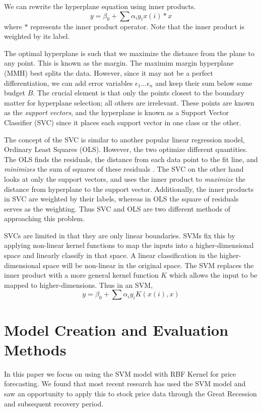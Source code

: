\documentclass[pageno]{jpaper}
\begin{document}
We can rewrite the hyperplane equation using inner products.
$$y = \beta_0 + \sum \alpha_iy_ix(i)*x$$
where $*$ represents the inner product operator. Note that the inner product is weighted by its label. 

The optimal hyperplane is such that we maximize the distance from the plane to any point. This is known as the margin. The maximim margin hyperplane (MMH) best splits the data. However, since it may not be a perfect differentiation, we can add error variables $\epsilon_1 ... \epsilon_n$ and keep their sum below some budget $B$. The crucial element is that only the points closest to the boundary matter for hyperplane selection; all others are irrelevant. These points are known as the {\em support vectors}, and the hyperplane is known as a Support Vector Classifier (SVC) since it places each support vector in one class or the other.

The concept of the SVC is similar to another popular linear regression model, Ordinary Least Squares (OLS). However, the two optimize different quantities. The OLS finds the residuals, the distance from each data point to the fit line, and {\em minimizes} the sum of squares of these residuals \cite{watson}. The SVC on the other hand looks at only the support vectors, and uses the inner product to {\em maximize} the distance from hyperplane to the support vector. Additionally, the inner products in SVC are weighted by their labels, whereas in OLS the square of residuals serves as the weighting. Thus SVC and OLS are two different methods of approaching this problem.

SVCs are limited in that they are only linear boundaries. SVMs fix this by applying non-linear kernel functions to map the inputs into a higher-dimensional space and linearly classify in that space. A linear classification in the higher-dimensional space will be non-linear in the original space. The SVM replaces the inner product with a more general kernel function $K$ which allows the input to be mapped to higher-dimensions. Thus in an SVM,
$$y = \beta_0 + \sum \alpha_i y_i K(x(i),x)$$

\section{Model Creation and Evaluation Methods}
In this paper we focus on using the SVM model with RBF Kernel for price forecasting. We found that most recent research has used the SVM model and saw an opportunity to apply this to stock price data through the Great Recession and subsequent recovery period. 
\end{document}
